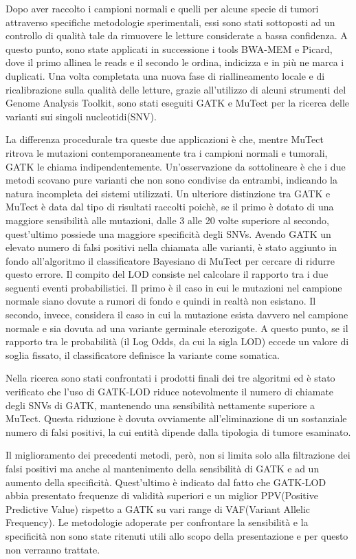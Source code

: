 Dopo aver raccolto i campioni normali e quelli per alcune specie di tumori attraverso specifiche metodologie sperimentali, essi sono stati sottoposti ad un controllo di qualità tale da rimuovere le letture considerate a bassa confidenza.
A questo punto, sono state applicati in successione i tools BWA-MEM e Picard, dove il primo allinea le reads e il secondo le ordina, indicizza e in più ne marca i duplicati.
Una volta completata una nuova fase di riallineamento locale e di ricalibrazione sulla qualità delle letture, grazie all'utilizzo di alcuni strumenti del Genome Analysis Toolkit, sono stati eseguiti GATK e MuTect per la ricerca delle varianti sui singoli nucleotidi(SNV).

La differenza procedurale tra queste due applicazioni è che, mentre MuTect ritrova le mutazioni contemporaneamente tra i campioni normali e tumorali, GATK le chiama indipendentemente.
Un'osservazione da sottolineare è che i due metodi scovano pure varianti che non sono condivise da entrambi, indicando la natura incompleta dei sistemi utilizzati.
Un ulteriore distinzione tra GATK e MuTect è data dal tipo di risultati raccolti poichè, se il primo è dotato di una maggiore sensibilità alle mutazioni, dalle 3 alle 20 volte superiore al secondo, quest'ultimo possiede una maggiore specificità degli SNVs.
Avendo GATK un elevato numero di falsi positivi nella chiamata alle varianti, è stato aggiunto in fondo all'algoritmo il classificatore Bayesiano di MuTect per cercare di ridurre questo errore.
Il compito del LOD consiste nel calcolare il rapporto tra i due seguenti eventi probabilistici.
Il primo è il caso in cui le mutazioni nel campione normale siano dovute a rumori di fondo e quindi in realtà non esistano.
Il secondo, invece, considera il caso in cui la mutazione esista davvero nel campione normale e sia dovuta ad una variante germinale eterozigote.
A questo punto, se il rapporto tra le probabilità (il Log Odds, da cui la sigla LOD) eccede un valore di soglia fissato, il classificatore definisce la variante come somatica.

Nella ricerca sono stati confrontati i prodotti finali dei tre algoritmi ed è stato verificato che l'uso di GATK-LOD riduce notevolmente il numero di chiamate degli SNVs di GATK, mantenendo una sensibilità nettamente superiore a MuTect.
Questa riduzione è dovuta ovviamente all'eliminazione di un sostanziale numero di falsi positivi, la cui entità dipende dalla tipologia di tumore esaminato.

Il miglioramento dei precedenti metodi, però, non si limita solo alla filtrazione dei falsi positivi ma anche al mantenimento della sensibilità di GATK e ad un aumento della specificità.
Quest'ultimo è indicato dal fatto che GATK-LOD abbia presentato frequenze di validità superiori e un miglior PPV(Positive Predictive Value) rispetto a GATK su vari range di VAF(Variant Allelic Frequency).
Le metodologie adoperate per confrontare la sensibilità e la specificità non sono state ritenuti utili allo scopo della presentazione e per questo non verranno trattate.

